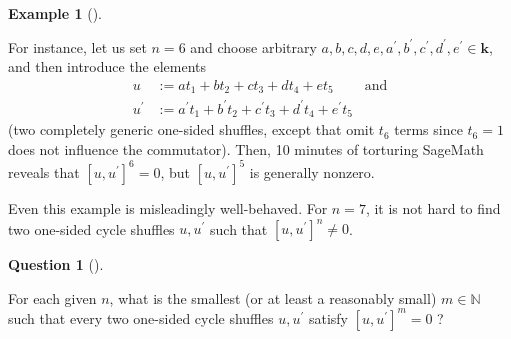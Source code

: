 \documentclass[numbers=enddot,12pt,final,onecolumn,notitlepage]{scrartcl}%
\theoremstyle{definition}
\newtheorem{quest}[theo]{Question}
\newenvironment{question}[1][]
{\begin{quest}[#1]\begin{leftbar}}
{\end{leftbar}\end{quest}}
\newtheorem{exam}[theo]{Example}
\newenvironment{example}[1][]
{\begin{exam}[#1]\begin{leftbar}}
{\end{leftbar}\end{exam}}
\newenvironment{question}[1][Question]{\noindent\textbf{#1.} }{\ \rule{0.5em}{0.5em}}
\begin{document}
\begin{example}
For instance, let us set $n=6$ and choose arbitrary $a,b,c,d,e,a^{\prime
},b^{\prime},c^{\prime},d^{\prime},e^{\prime}\in\mathbf{k}$, and then
introduce the elements%
\begin{align*}
u  &  :=at_{1}+bt_{2}+ct_{3}+dt_{4}+et_{5}\ \ \ \ \ \ \ \ \ \ \text{and}\\
u^{\prime}  &  :=a^{\prime}t_{1}+b^{\prime}t_{2}+c^{\prime}t_{3}+d^{\prime
}t_{4}+e^{\prime}t_{5}%
\end{align*}
(two completely generic one-sided shuffles, except that omit $t_{6}$ terms
since $t_{6}=1$ does not influence the commutator). Then, 10 minutes of
torturing SageMath reveals that $\left[  u,u^{\prime}\right]  ^{6}=0$, but
$\left[  u,u^{\prime}\right]  ^{5}$ is generally nonzero.
\end{example}

Even this example is misleadingly well-behaved. For $n=7$, it is not hard to
find two one-sided cycle shuffles $u,u^{\prime}$ such that $\left[
u,u^{\prime}\right]  ^{n}\neq0$.

\begin{question}
For each given $n$, what is the smallest (or at least a reasonably small)
$m\in\mathbb{N}$ such that every two one-sided cycle shuffles $u,u^{\prime}$
satisfy $\left[  u,u^{\prime}\right]  ^{m}=0$ ?
\end{question}



\end{document}
